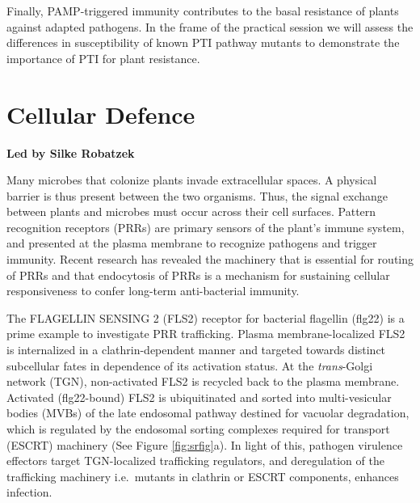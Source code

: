 \documentclass[12pt,]{book}
\theoremstyle{definition}
\theoremstyle{definition}
\theoremstyle{remark}
\begin{document}
Finally, PAMP-triggered immunity contributes to the basal resistance of
plants against adapted pathogens. In the frame of the practical session
we will assess the differences in susceptibility of known PTI pathway
mutants to demonstrate the importance of PTI for plant resistance.

\chapter*{Cellular Defence}\label{cellular-defence}

\textbf{Led by Silke Robatzek}

Many microbes that colonize plants invade extracellular spaces. A
physical barrier is thus present between the two organisms. Thus, the
signal exchange between plants and microbes must occur across their cell
surfaces. Pattern recognition receptors (PRRs) are primary sensors of
the plant's immune system, and presented at the plasma membrane to
recognize pathogens and trigger immunity. Recent research has revealed
the machinery that is essential for routing of PRRs and that endocytosis
of PRRs is a mechanism for sustaining cellular responsiveness to confer
long-term anti-bacterial immunity.

The FLAGELLIN SENSING 2 (FLS2) receptor for bacterial flagellin (flg22)
is a prime example to investigate PRR trafficking. Plasma
membrane-localized FLS2 is internalized in a clathrin-dependent manner
and targeted towards distinct subcellular fates in dependence of its
activation status. At the \emph{trans}-Golgi network (TGN),
non-activated FLS2 is recycled back to the plasma membrane. Activated
(flg22-bound) FLS2 is ubiquitinated and sorted into multi-vesicular
bodies (MVBs) of the late endosomal pathway destined for vacuolar
degradation, which is regulated by the endosomal sorting complexes
required for transport (ESCRT) machinery (See Figure \ref{fig:srfig}a).
In light of this, pathogen virulence effectors target TGN-localized
trafficking regulators, and deregulation of the trafficking machinery
i.e.~mutants in clathrin or ESCRT components, enhances infection.
\end{document}
